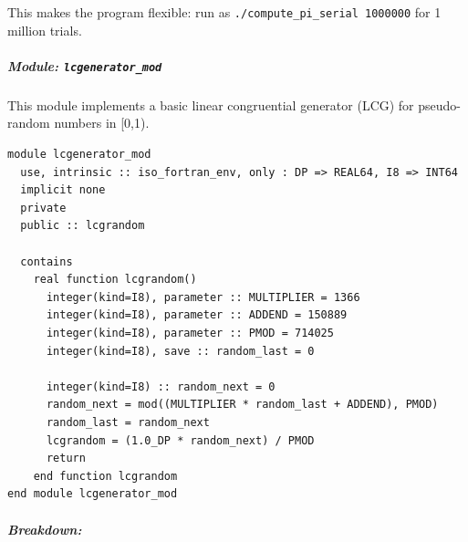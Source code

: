This makes the program flexible: run as \texttt{./compute\_pi\_serial 1000000} for 1 million trials.

\subparagraph{Module: \texttt{lcgenerator\_mod}}

This module implements a basic linear congruential generator (LCG) for pseudo-random numbers in [0,1).

\begin{verbatim}
module lcgenerator_mod
  use, intrinsic :: iso_fortran_env, only : DP => REAL64, I8 => INT64
  implicit none
  private
  public :: lcgrandom

  contains
    real function lcgrandom()
      integer(kind=I8), parameter :: MULTIPLIER = 1366
      integer(kind=I8), parameter :: ADDEND = 150889
      integer(kind=I8), parameter :: PMOD = 714025
      integer(kind=I8), save :: random_last = 0

      integer(kind=I8) :: random_next = 0
      random_next = mod((MULTIPLIER * random_last + ADDEND), PMOD)
      random_last = random_next
      lcgrandom = (1.0_DP * random_next) / PMOD
      return
    end function lcgrandom
end module lcgenerator_mod
\end{verbatim}

\subparagraph{Breakdown:}

